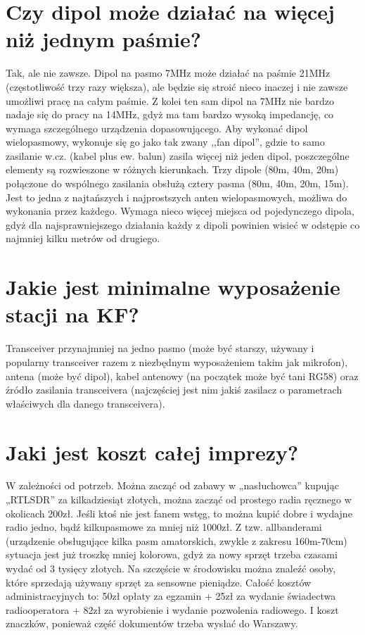 \documentclass[a4paper,12pt]{article}
\begin{document}
\section{Czy dipol może działać na więcej niż jednym paśmie?}
Tak, ale nie zawsze. Dipol na pasmo 7MHz może działać na paśmie 21MHz (częstotliwość trzy razy większa), ale będzie się stroić nieco inaczej i nie zawsze umożliwi pracę na całym paśmie. Z kolei ten sam dipol na 7MHz nie bardzo nadaje się do pracy na 14MHz, gdyż ma tam bardzo wysoką impedancję, co wymaga szczególnego urządzenia dopasowującego. Aby wykonać dipol wielopasmowy, wykonuje się go jako tak zwany ,,fan dipol'', gdzie to samo zasilanie w.cz. (kabel plus ew. balun) zasila więcej niż jeden dipol, poszczególne elementy są rozwieszone w różnych kierunkach. Trzy dipole (80m, 40m, 20m) połączone do wspólnego zasilania obsłużą cztery pasma (80m, 40m, 20m, 15m). Jest to jedna z najtańszych i najprostszych anten wielopasmowych, możliwa do wykonania przez każdego. Wymaga nieco więcej miejsca od pojedynczego dipola, gdyż dla najsprawniejszego działania każdy z dipoli powinien wisieć w odstępie co najmniej kilku metrów od drugiego.

\section{Jakie jest minimalne wyposażenie stacji na KF?}
Transceiver przynajmniej na jedno pasmo (może być starszy, używany i popularny transceiver razem z niezbędnym wyposażeniem takim jak mikrofon), antena (może być dipol), kabel antenowy (na początek może być tani RG58) oraz źródło zasilania transceivera (najczęściej jest nim jakiś zasilacz o parametrach właściwych dla danego transceivera).

\section{Jaki jest koszt całej imprezy?}
W zależności od potrzeb. Można zacząć od zabawy w „nasłuchowca” kupując „RTLSDR” za kilkadziesiąt złotych, można zacząć od prostego radia ręcznego w okolicach 200zł. Jeśli ktoś nie jest fanem wstęg, to można kupić dobre i wydajne radio jedno, bądź kilkupasmowe za mniej niż 1000zł. Z tzw. allbanderami (urządzenie obsługujące kilka pasm amatorskich, zwykle z zakresu 160m-70cm) sytuacja jest już troszkę mniej kolorowa, gdyż za nowy sprzęt trzeba czasami wydać od 3 tysięcy złotych. Na szczęście w środowisku można znaleźć osoby, które sprzedają używany sprzęt za sensowne pieniądze.
Całość kosztów administracyjnych to: 50zł opłaty za egzamin + 25zł za wydanie świadectwa radiooperatora + 82zł za wyrobienie i wydanie pozwolenia radiowego. I koszt znaczków, ponieważ część dokumentów trzeba wysłać do Warszawy.
\end{document}
